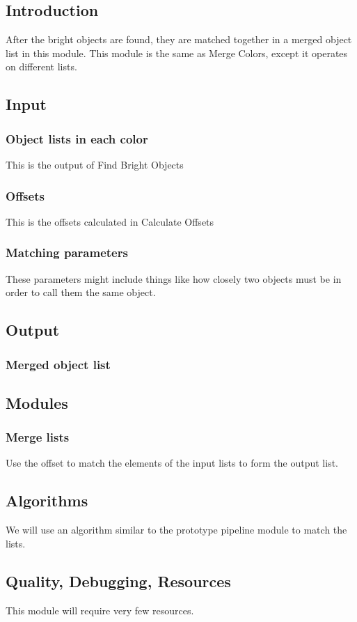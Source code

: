 
\subsection{Introduction}

After the bright objects are found, they are matched together in a merged 
object list in this module.  This module is the same as Merge Colors, except
it operates on different lists.

\subsection{Input}

\subsubsection{Object lists in each color}

This is the output of Find Bright Objects

\subsubsection{Offsets}

This is the offsets calculated in Calculate Offsets

\subsubsection{Matching parameters}

These parameters might include things like how closely two objects must
be in order to call them the same object.

\subsection{Output}

\subsubsection{Merged object list}

\subsection{Modules}

\subsubsection{Merge lists}

Use the offset to match the elements of the input lists to form the
output list.

\subsection{Algorithms}

We will use an algorithm similar to the prototype pipeline module to match
the lists.

\subsection{Quality, Debugging, Resources}

This module will require very few resources.
